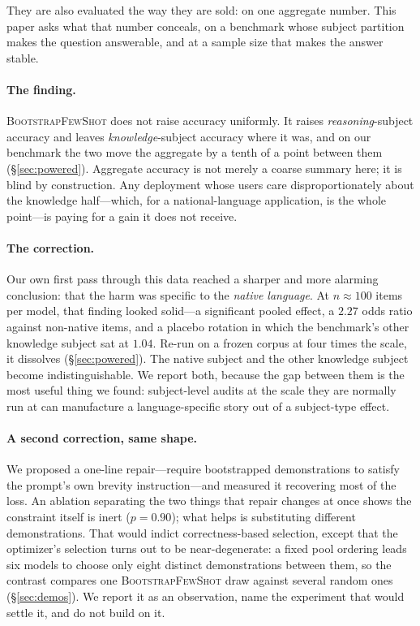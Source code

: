 \documentclass[11pt]{article}
\newcommand{\bsfs}{\textsc{BootstrapFewShot}}
\begin{document}
They are also evaluated the way they are sold: on one aggregate number. This paper asks
what that number conceals, on a benchmark whose subject partition makes the question
answerable, and at a sample size that makes the answer stable.

\paragraph{The finding.} \bsfs{} does not raise accuracy uniformly. It raises
\emph{reasoning}-subject accuracy and leaves \emph{knowledge}-subject accuracy where it
was, and on our benchmark the two move the aggregate by a tenth of a point between them
(\S\ref{sec:powered}). Aggregate accuracy is not merely a coarse summary here; it is
blind by construction. Any deployment whose users care disproportionately about the
knowledge half---which, for a national-language application, is the whole point---is
paying for a gain it does not receive.

\paragraph{The correction.} Our own first pass through this data reached a sharper and
more alarming conclusion: that the harm was specific to the \emph{native language}. At
$n{\approx}100$ items per model, that finding looked solid---a significant pooled
effect, a $2.27$ odds ratio against non-native items, and a placebo rotation in which
the benchmark's other knowledge subject sat at $1.04$. Re-run on a frozen corpus at four
times the scale, it dissolves (\S\ref{sec:powered}). The native subject and the other
knowledge subject become indistinguishable. We report both, because the gap between them
is the most useful thing we found: subject-level audits at the scale they are normally
run at can manufacture a language-specific story out of a subject-type effect.

\paragraph{A second correction, same shape.} We proposed a one-line repair---require
bootstrapped demonstrations to satisfy the prompt's own brevity instruction---and
measured it recovering most of the loss. An ablation separating the two things that
repair changes at once shows the constraint itself is inert ($p{=}0.90$); what helps is
substituting different demonstrations. That would indict correctness-based selection,
except that the optimizer's selection turns out to be near-degenerate: a fixed pool
ordering leads six models to choose only eight distinct demonstrations between them, so
the contrast compares one \bsfs{} draw against several random ones (\S\ref{sec:demos}).
We report it as an observation, name the experiment that would settle it, and do not
build on it.
\end{document}
